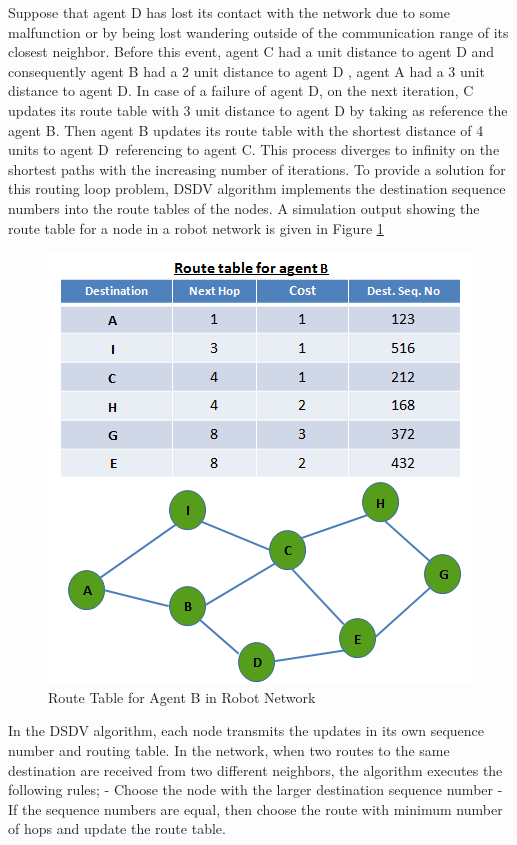 Suppose that agent D has lost its contact with the network due to some malfunction or by being lost wandering outside of the communication range of its closest neighbor. Before this event, agent C had a unit distance to agent D and consequently agent B had a 2 unit distance to agent D , agent A had a 3 unit distance to agent D. In case of a failure of agent D, on the next iteration, C updates its route table with 3 unit distance to agent D by taking as reference the agent B. Then agent B updates its route table with the shortest distance of 4 units to agent D\ referencing to agent C. This process diverges to infinity on the shortest paths with the increasing number of iterations. To provide a solution for this routing loop problem, DSDV algorithm implements the destination sequence numbers into the route tables of the nodes. A simulation output showing the route table for a node in a robot network is given in Figure \ref{dest_seq_ref}

\begin{figure}[H]
\caption{Route Table for Agent B in Robot Network} \label{dest_seq_ref}
\centering
\includegraphics[scale = 0.75]{dest_seq}
\end{figure}

In the DSDV algorithm, each node transmits the updates in its own sequence number and routing table. In the network, when two routes to the same destination are received from two different neighbors, the algorithm executes the following rules;\newline
	- Choose the node with the larger destination sequence number \newline
	- If the sequence numbers are equal, then choose the route with minimum number of hops and update the route table.

